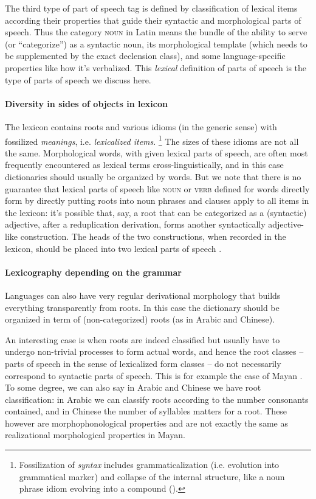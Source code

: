 \documentclass[a4paper, oneside, 12pt]{report}
\newcommand*{\citechap}[1]{chap.~{#1}}
\newcommand*{\citepage}[1]{p.~{#1}}
\newcommand*{\term}[1]{\emph{#1}}
\newcommand*{\category}[1]{\textsc{#1}}
\begin{document}
The third type of part of speech tag is defined by classification of lexical items
according their properties that guide their syntactic and morphological parts of speech.
Thus the category \category{noun} in Latin means the bundle of 
the ability to serve (or ``categorize'') as a syntactic noun, its morphological template
(which needs to be supplemented by the exact declension class),
and some language-specific properties like how it's verbalized.
This \emph{lexical} definition of parts of speech is the type of parts of speech we discuss here.

\paragraph*{Diversity in sides of objects in lexicon}
The lexicon contains roots and various idioms (in the generic sense) with fossilized \emph{meanings},
i.e. \term{lexicalized items}.%
\footnote{
    Fossilization of \emph{syntax} includes grammaticalization (i.e. evolution into grammatical marker)
    and collapse of the internal structure,
    like a noun phrase idiom evolving into a compound
    ().
}
The sizes of these idioms are not all the same.
Morphological words, with given lexical parts of speech,
are often most frequently encountered as lexical terms cross-linguistically,
and in this case dictionaries should usually be organized by words.
But we note that there is no guarantee that lexical parts of speech like \category{noun} or \category{verb}
defined for words directly form by directly putting roots into noun phrases and clauses 
apply to all items in the lexicon:
it's possible that, say, a root that can be categorized as a (syntactic) adjective,
after a reduplication derivation, forms another syntactically adjective-like construction.
The heads of the two constructions, when recorded in the lexicon,
should be placed into two lexical parts of speech \citep[\citechap{5}]{paul2014new}. 

\paragraph*{Lexicography depending on the grammar}
Languages can also have very regular derivational morphology that builds everything transparently from roots.
In this case the dictionary should be organized in term of (non-categorized) roots (as in Arabic and Chinese).

An interesting case is when roots are indeed classified but usually have to undergo non-trivial processes to form actual words,
and hence the root classes -- parts of speech in the sense of lexicalized form classes -- do not necessarily correspond to syntactic parts of speech.
This is for example the case of Mayan \citep[\citepage{372}]{siddiqi2020routledge}.
To some degree, we can also say in Arabic and Chinese we have root classification:
in Arabic we can classify roots according to the number consonants contained,
and in Chinese the number of syllables matters for a root.
These however are morphophonological properties
and are not exactly the same as realizational morphological properties in Mayan.
\end{document}

